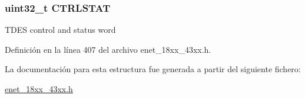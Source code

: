 \subsubsection[{\texorpdfstring{C\+T\+R\+L\+S\+T\+AT}{CTRLSTAT}}]{ uint32\+\_\+t C\+T\+R\+L\+S\+T\+AT}\hypertarget{struct_e_n_e_t___t_x_d_e_s_c___t_a57ef6fedebbfbb6aa9f765be71c15dbb}{}\label{struct_e_n_e_t___t_x_d_e_s_c___t_a57ef6fedebbfbb6aa9f765be71c15dbb}
T\+D\+ES control and status word 

Definición en la línea 407 del archivo enet\+\_\+18xx\+\_\+43xx.\+h.



La documentación para esta estructura fue generada a partir del siguiente fichero\+:\begin{DoxyCompactItemize}
\item 
\hyperlink{enet__18xx__43xx_8h}{enet\+\_\+18xx\+\_\+43xx.\+h}\end{DoxyCompactItemize}
